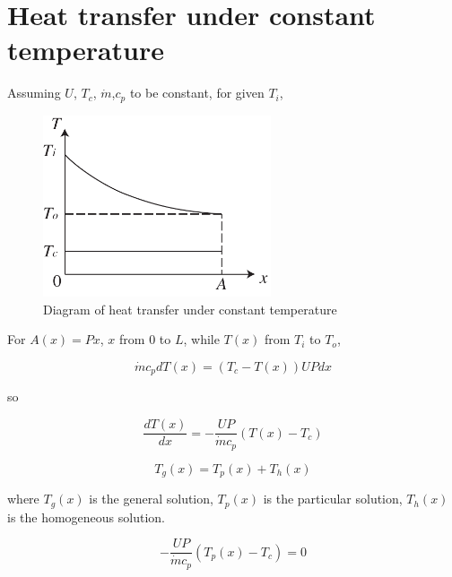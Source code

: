 \appendix

\chapter{Heat transfer under constant temperature}
Assuming $U$, $T_{c}$, $\dot{m}$,$c_{p}$ to be constant, for given $T_{i}$,

\noindent \begin{center}
\begin{figure}[h]
\begin{centering}
\includegraphics[width=0.6\textwidth]{fig/ConstTempHX.pdf}
\par\end{centering}
\caption{Diagram of heat transfer under constant temperature}
\label{fig:CTHX}
\end{figure}
\par\end{center}

For $A(x)=Px$, $x$ from $0$ to $L$, while $T(x)$ from $T_{i}$ to $T_{o}$,

\begin{equation}
\dot{m}c_{p}dT(x)=(T_{c}-T(x))UPdx
\end{equation}

so

\begin{equation}
\frac{dT(x)}{dx}=-\frac{UP}{\dot{m}c_{p}}(T(x)-T_{c})
\end{equation}

\begin{equation}
T_{g}(x)=T_{p}(x)+T_{h}(x)
\end{equation}

where $T_{g}(x)$ is the general solution, $T_{p}(x)$ is the particular
solution, $T_{h}(x)$ is the homogeneous solution.

\begin{equation}
-\frac{UP}{\dot{m}c_{p}}(T_{p}(x)-T_{c})=0
\end{equation}

